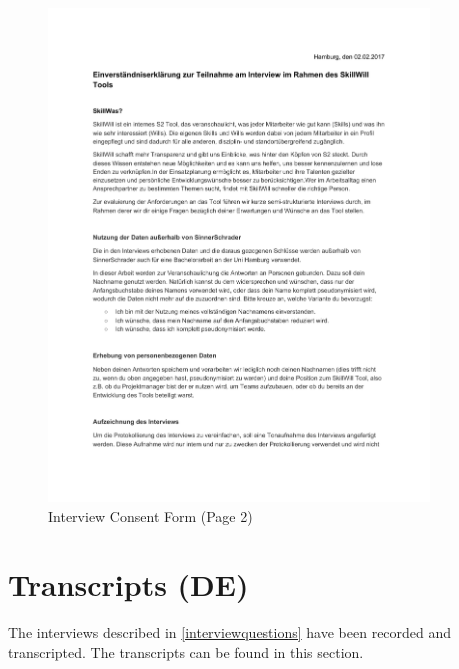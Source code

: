 \begin{figure}[!h]
    \centering
    \includegraphics[width=0.9\textwidth,page=2]{images/Interview_Consent.pdf}
    \caption[]{Interview Consent Form (Page 2)}
\end{figure}

\newpage

\section{Transcripts (DE)}
\label{transcripts}
The interviews described in \ref{interviewquestions} have been recorded and transcripted. The transcripts can be found in this section.

